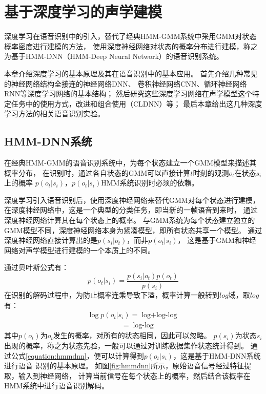 ﻿%

\chapter{基于深度学习的声学建模}\label{intro_dl}


深度学习在语音识别中的引入，替代了经典HMM-GMM系统中采用GMM对状态概率密度进行建模的方法，
使用深度神经网络对状态的概率分布进行建模，称之为基于HMM-DNN（HMM-Deep Neural Network）的语音识别系统。

本章介绍深度学习的基本原理及其在语音识别中的基本应用。
首先介绍几种常见的神经网络结构全接连的神经网络DNN、
卷积神经网络CNN、循环神经网络RNN等深度学习网络的基本结构；
然后研究这些深度学习网络在声学模型这个特定任务中的使用方式，改进和组合使用（CLDNN）等；
最后本章给出这几种深度学习方法的相关语音识别实验。

\section{HMM-DNN系统}\label{section:hmmdl}

在经典HMM-GMM的语音识别系统中，为每个状态建立一个GMM模型来描述其概率分布，
在识别时，通过各自状态的GMM可以直接计算$t$时刻的观测$o_t$在状态$s_i$上的概率
$p(o_t|s_i)$，$p(o_t|s_i)$HMM系统识别时必须的依赖。

深度学习引入语音识别后，使用深度神经网络来替代GMM对每个状态进行建模，
在深度神经网络中，这是一个典型的分类任务，即当新的一帧语音到来时，
通过深度神经网络计算其在每个状态上的概率。
与GMM系统为每个状态建立独立的GMM模型不同，深度神经网络本身为紧凑模型，即所有状态共享一个模型。
通过深度神经网络直接计算出的是$p(s_i|o_t)$，而非$p(o_t|s_i)$，
这是基于GMM和神经网络对声学模型进行建模的一个本质上的不同。

通过贝叶斯公式有：
\begin{equation}
p(o_t|s_i) = \frac{p(s_i|o_t)p(o_t)}{p(s_i)}
\end{equation}
在识别的解码过程中，为防止概率连乘导致下溢，概率计算一般转到$log$域，取$log$有：
\begin{equation} \label{equation:hmmdnn}
\begin{array}{l}
\log{p(o_t|s_i)} = \mathop {\log{p(s_i|o_t)} + \log{p(o_t)} - \log{p(s_i)}} \\
\;\;\;\;\;\;\;\;\;\;\;\;\;\;\;\;\; = \mathop {\log{p(s_i|o_t)} - \log{p(s_i)}}
\end{array}
\end{equation}
其中$p(o_t)$为$o_t$发生的概率，对所有的状态相同，因此可以忽略。
$p(s_i)$为状态$s_i$出现的概率，称之为状态先验，一般可以通过对训练数据集作状态统计得到。
通过公式\ref{equation:hmmdnn}，便可以计算得到$p(o_t|s_i)$，这是基于HMM-DNN系统进行语音
识别的基本原理。
如图\ref{fig:hmmdnn}所示，原始语音信号经过特征提取，输入到神经网络，
计算当前信号在每个状态上的概率，然后结合该概率在HMM系统中进行语音识别解码。


